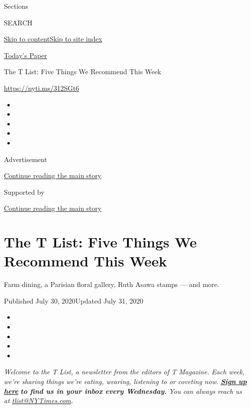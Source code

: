 Sections

SEARCH

\protect\hyperlink{site-content}{Skip to
content}\protect\hyperlink{site-index}{Skip to site index}

\href{https://myaccount.nytimes3xbfgragh.onion/auth/login?response_type=cookie\&client_id=vi}{}

\href{https://www.nytimes3xbfgragh.onion/section/todayspaper}{Today's
Paper}

The T List: Five Things We Recommend This Week

\url{https://nyti.ms/312SGt6}

\begin{itemize}
\item
\item
\item
\item
\item
\end{itemize}

Advertisement

\protect\hyperlink{after-top}{Continue reading the main story}

Supported by

\protect\hyperlink{after-sponsor}{Continue reading the main story}

\hypertarget{the-t-list-five-things-we-recommend-this-week}{%
\section{The T List: Five Things We Recommend This
Week}\label{the-t-list-five-things-we-recommend-this-week}}

Farm dining, a Parisian floral gallery, Ruth Asawa stamps --- and more.

Published July 30, 2020Updated July 31, 2020

\begin{itemize}
\item
\item
\item
\item
\item
\end{itemize}

\emph{Welcome to the T List, a newsletter from the editors of T
Magazine. Each week, we're sharing things we're eating, wearing,
listening to or coveting now.}
\textbf{\href{https://www.nytimes3xbfgragh.onion/newsletters/t-list?module=inline}{\emph{Sign
up here}}} \emph{\textbf{to find us in your inbox every Wednesday.}}
\emph{You can always reach us at}
\href{mailto:tlist@NYTimes.com}{\emph{tlist@NYTimes.com}}\emph{.}

